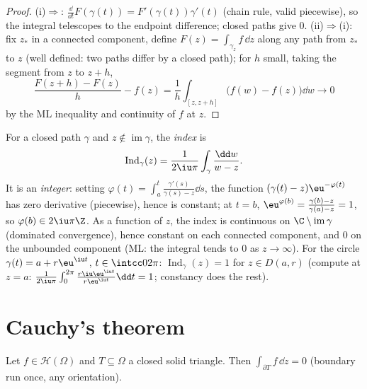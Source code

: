 \begin{proof}
(i)$\Rightarrow$: $\frac{\dd}{\dd t}F(\gamma(t)) =
F'(\gamma(t))\gamma'(t)$ (chain rule, valid piecewise), so the
integral telescopes to the endpoint difference; closed paths
give $0$. (ii)$\Rightarrow$(i): fix $z_*$ in a connected
component, define $F(z) = \int_{\gamma_z}f\,\dd z$ along any
path from $z_*$ to $z$ (well defined: two paths differ by a
closed path); for $h$ small, taking the segment from $z$ to
$z + h$,
\[
\frac{F(z + h) - F(z)}{h} - f(z)
= \frac1h\int_{[z, z+h]}\bigl(f(w) - f(z)\bigr)\dd w
\longrightarrow 0
\]
by the ML inequality and continuity of $f$ at $z$.
\end{proof}

\begin{definition}\label{def:b3:holomorphic:index}
For a closed path $\gamma$ and $z \notin
\operatorname{im}\gamma$, the \emph{index} is
\[
\operatorname{Ind}_\gamma(z) = \frac1{2\iu\pi}
\int_\gamma\frac{\dd w}{w - z} .
\]
It is an \emph{integer}: setting $\varphi(t) =
\int_a^t\frac{\gamma'(s)}{\gamma(s) - z}\dd s$, the function
$(\gamma(t) - z)\eu^{-\varphi(t)}$ has zero derivative
(piecewise), hence is constant; at $t = b$, $\eu^{\varphi(b)} =
\frac{\gamma(b) - z}{\gamma(a) - z} = 1$, so $\varphi(b) \in
2\iu\pi\Z$. As a function of $z$, the index is continuous on
$\C\setminus\operatorname{im}\gamma$ (dominated convergence),
hence constant on each connected component, and $0$ on the
unbounded component (ML: the integral tends to $0$ as $z \to
\infty$). For the circle $\gamma(t) = a + r\eu^{\iu t}$, $t
\in \intcc0{2\pi}$: $\operatorname{Ind}_\gamma(z) = 1$ for $z
\in D(a,r)$ (compute at $z = a$: $\frac1{2\iu\pi}
\int_0^{2\pi}\frac{r\iu\eu^{\iu t}}{r\eu^{\iu t}}\dd t = 1$;
constancy does the rest).
\end{definition}

\section{Cauchy's theorem}

\begin{theorem}[Goursat]\label{thm:b3:holomorphic:goursat}
Let $f \in \mathcal H(\Omega)$ and $T \subseteq \Omega$ a
closed solid triangle. Then $\int_{\partial T}f\,\dd z = 0$
(boundary run once, any orientation).
\end{theorem}

